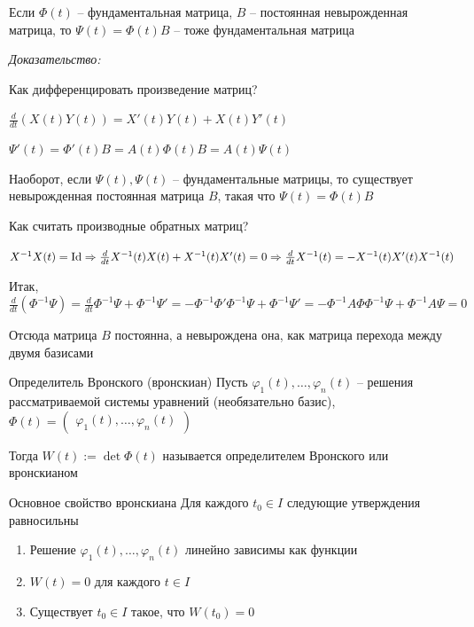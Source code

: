 \documentclass[12pt]{article}
\begin{document}
\begin{lem}{}
    Если $\Phi(t)$ -- фундаментальная матрица, $B$ -- постоянная невырожденная матрица, то $\Psi(t) = \Phi(t)B$ -- тоже фундаментальная матрица
\end{lem}

\textit{Доказательство:}

Как дифференцировать произведение матриц? 

$\frac{d}{dt}(X(t)Y(t)) = X'(t)Y(t) + X(t)Y'(t)$

$\Psi'(t) = \Phi'(t)B = A(t)\Phi(t)B = A(t)\Psi(t)$

Наоборот, если $\Psi(t), \Psi(t)$ -- фундаментальные матрицы, то существует невырожденная постоянная матрица $B$, такая что $\Psi(t) = \Phi(t)B$

Как считать производные обратных матриц? 

$X^{-1}X(t) = \operatorname{Id} \Rightarrow \frac{d}{dt}X^{-1}(t)X(t) + X^{-1}(t)X'(t) = 0 \Rightarrow \frac{d}{dt}X^{-1}(t) = -X^{-1}(t)X'(t)X^{-1}(t)$

Итак, $\frac{d}{dt}(\Phi^{-1}\Psi) = \frac{d}{dt}\Phi^{-1}\Psi + \Phi^{-1}\Psi' = -\Phi^{-1}\Phi'\Phi^{-1}\Psi + \Phi^{-1}\Psi' = -\Phi^{-1}A\Phi\Phi^{-1}\Psi + \Phi^{-1}A\Psi = 0$

Отсюда матрица $B$ постоянна, а невырождена она, как матрица перехода между двумя базисами

\begin{defin}{Определитель Вронского (вронскиан)}
    Пусть $\varphi_1(t), \ldots, \varphi_n(t)$ -- решения рассматриваемой системы уравнений (необязательно базис), $\Phi(t) = \begin{pmatrix}
        \varphi_1(t), \ldots, \varphi_n(t)
    \end{pmatrix}$

    Тогда $W(t) := \det \Phi(t)$ называется определителем Вронского или вронскианом
\end{defin}

\begin{lem}{Основное свойство вронскиана}
    Для каждого $t_0 \in I$ следующие утверждения равносильны 

    \begin{enumerate}
        \item Решение $\varphi_1(t), \ldots, \varphi_n(t)$ линейно зависимы как функции 
        \item $W(t) = 0$ для каждого $t \in I$
        \item Существует $t_0 \in I$ такое, что $W(t_0) = 0$
    \end{enumerate}
\end{lem}
\end{document}
